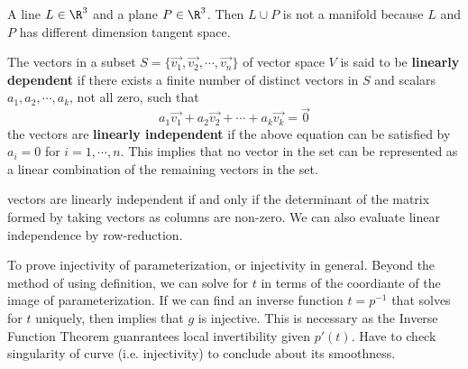 \documentclass[11pt]{article}
\begin{document}
\begin{example}
  A line $L\in \R^3$ and a plane $P\in \R^3$. Then $L\cup P$ is not a manifold because $L$ and $P$ has different dimension tangent space.
\end{example}


\begin{defn*}
  The vectors in a subset $S = \{ \vec{v_1}, \vec{v_2}, \cdots, \vec{v_n}\}$ of vector space $V$ is said to be \textbf{linearly dependent} if there exists a finite number of distinct vectors in $S$ and scalars $a_1, a_2, \cdots, a_k$, not all zero, such that
  \[
    a_1 \vec{v_1} + a_2 \vec{v_2} + \cdots + a_k \vec{v_k} = \vec{0}
  \]
  the vectors are \textbf{linearly independent} if the above equation can be satisfied by $a_i = 0$ for $i=1, \cdots, n$. This implies that no vector in the set can be represented as a linear combination of the remaining vectors in the set.
  \begin{rem}
    vectors are linearly independent if and only if the determinant of the matrix formed by taking vectors as columns are non-zero. We can also evaluate linear independence by row-reduction.
  \end{rem}
\end{defn*}

\begin{rem}
  To prove injectivity of parameterization, or injectivity in general. Beyond the method of using definition, we can solve for $t$ in terms of the coordiante of the image of parameterization. If we can find an inverse function $t = p^{-1}$ that solves for $t$ uniquely, then implies that $g$ is injective. This is necessary as the Inverse Function Theorem guanrantees local invertibility given $p'(t)$. Have to check singularity of curve (i.e. injectivity) to conclude about its smoothness.
\end{rem}
\end{document}
